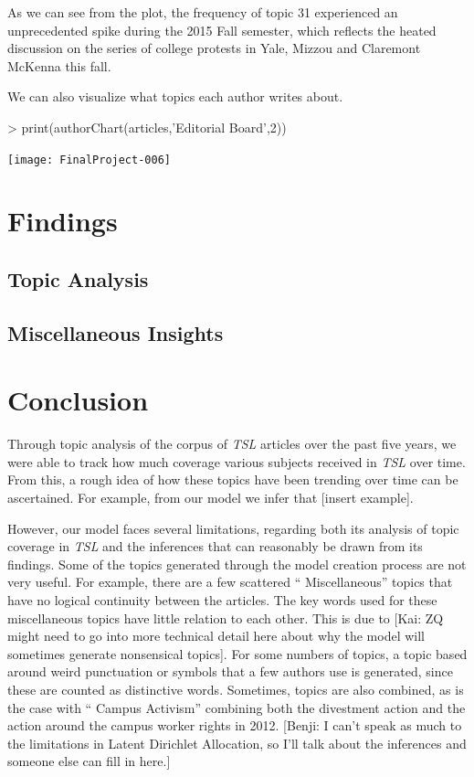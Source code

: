 \documentclass[a4paper]{article}
\begin{document}
As we can see from the plot, the frequency of topic 31 experienced an unprecedented spike during the 2015 Fall semester, which reflects the heated discussion on the series of college protests in Yale, Mizzou and Claremont McKenna this fall.

We can also visualize what topics each author writes about. 

\begin{Schunk}
\begin{Sinput}
> print(authorChart(articles,'Editorial Board',2))
\end{Sinput}
\end{Schunk}
\texttt{[image: FinalProject-006]}


\section{Findings}

\subsection{Topic Analysis}

\subsection{Miscellaneous Insights}

\section{Conclusion}
Through topic analysis of the corpus of \textit{TSL} articles over the past five years, we were able to track how much coverage various subjects received in \textit{TSL} over time. From this, a rough idea of how these topics have been trending over time can be ascertained. For example, from our model we infer that [insert example].

However, our model faces several limitations, regarding both its analysis of topic coverage in \textit{TSL} and the inferences that can reasonably be drawn from its findings. Some of the topics generated through the model creation process are not very useful. For example, there are a few scattered `` Miscellaneous''  topics that have no logical continuity between the articles. The key words used for these miscellaneous topics have little relation to each other. This is due to [Kai: ZQ might need to go into more technical detail here about why the model will sometimes generate nonsensical topics]. For some numbers of topics, a topic based around weird punctuation or symbols that a few authors use is generated, since these are counted as distinctive words. Sometimes, topics are also combined, as is the case with `` Campus Activism''  combining both the divestment action and the action around the campus worker rights in 2012. [Benji: I can't speak as much to the limitations in Latent Dirichlet Allocation, so I'll talk about the inferences and someone else can fill in here.]
\end{document}
